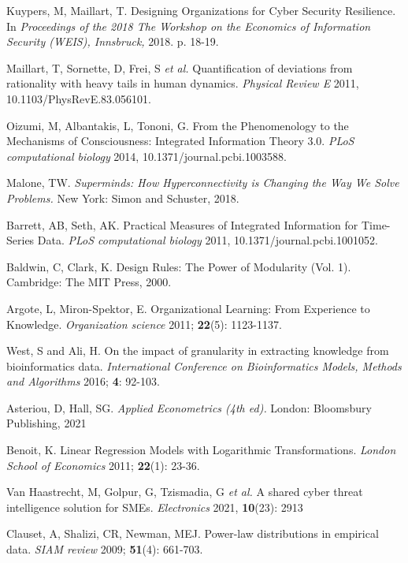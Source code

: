 \documentclass[unnumsec,webpdf,contemporary,large]{oup-authoring-template}%
\theoremstyle{thmstyleone}%
\theoremstyle{thmstyletwo}%
\theoremstyle{thmstylethree}%
\begin{document}
\begin{thebibliography}{10}
Kuypers, M, Maillart, T. Designing Organizations for Cyber Security Resilience. In {\em Proceedings of the 2018 The Workshop on the Economics of Information Security (WEIS), Innsbruck,} 2018. p. 18-19.

Maillart, T, Sornette, D, Frei, S {\em et al.} Quantification of deviations from rationality with heavy tails in human dynamics. {\em Physical Review E} 2011, 10.1103/PhysRevE.83.056101.

Oizumi, M, Albantakis, L, Tononi, G. From the Phenomenology to the Mechanisms of Consciousness: Integrated Information Theory 3.0. {\em PLoS computational biology} 2014, 10.1371/journal.pcbi.1003588.

Malone, TW. {\em Superminds: How Hyperconnectivity is Changing the Way We Solve Problems.} New York: Simon and Schuster, 2018.

Barrett, AB, Seth, AK. Practical Measures of Integrated Information for Time-Series Data. {\em PLoS computational biology} 2011, 10.1371/journal.pcbi.1001052.

Baldwin, C, Clark, K. Design Rules: The Power of Modularity (Vol. 1). Cambridge: The MIT Press, 2000.

Argote, L, Miron-Spektor, E. Organizational Learning: From Experience to Knowledge. {\em Organization science} 2011; {\bf 22}(5): 1123-1137.

West, S and Ali, H. On the impact of granularity in extracting knowledge from bioinformatics data. {\em International Conference on Bioinformatics Models, Methods and Algorithms} 2016; {\bf 4}: 92-103.

Asteriou, D, Hall, SG. {\em Applied Econometrics (4th ed).} London: Bloomsbury Publishing, 2021

Benoit, K. Linear Regression Models with Logarithmic Transformations. {\em London School of Economics} 2011; {\bf 22}(1): 23-36.

Van Haastrecht, M, Golpur, G, Tzismadia, G {\em et al.} A shared cyber threat intelligence solution for SMEs. {\em Electronics} 2021, {\bf 10}(23):  2913 

Clauset, A, Shalizi, CR, Newman, MEJ. Power-law distributions in empirical data. {\em SIAM review} 2009; {\bf 51}(4): 661-703.


\end{thebibliography}
\end{document}
